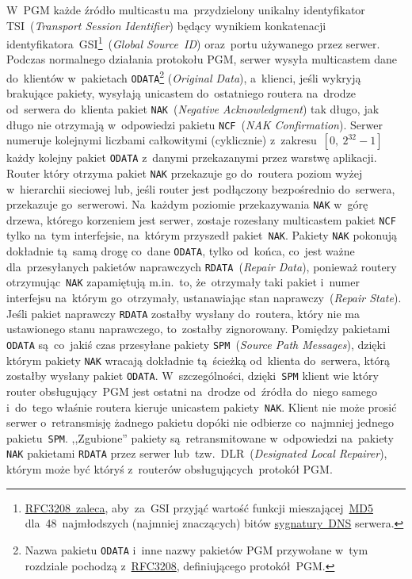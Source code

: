 \documentclass[thesis]{subfiles}
\begin{document}
W~PGM każde źródło multicastu ma~przydzielony unikalny identyfikator TSI~(\emph{Transport Session Identifier}) będący wynikiem konkatenacji identyfikatora~GSI\footnote{\href{https://tools.ietf.org/html/rfc3208\#page-33}{RFC3208~zaleca}, aby~za~GSI przyjąć wartość funkcji mieszającej~\href{https://en.wikipedia.org/wiki/MD5}{MD5} dla~48~najmłodszych (najmniej znaczących) bitów \href{https://tools.ietf.org/html/rfc2535\#section-4}{sygnatury~DNS} serwera.}~(\emph{Global Source~ID}) oraz~portu używanego przez serwer. Podczas normalnego działania protokołu PGM, serwer wysyła multicastem dane do~klientów w~pakietach \texttt{ODATA}\footnote{Nazwa pakietu \texttt{ODATA} i~inne nazwy pakietów PGM przywołane w~tym rozdziale pochodzą z~\href{https://tools.ietf.org/html/rfc3208}{RFC3208}, definiującego protokół~PGM.} (\emph{Original Data}), a~klienci, jeśli wykryją brakujące pakiety, wysyłają unicastem do~ostatniego routera na~drodze od~serwera do~klienta pakiet \texttt{NAK}~(\emph{Negative Acknowledgment}) tak długo, jak długo nie otrzymają w~odpowiedzi pakietu \texttt{NCF}~(\emph{NAK Confirmation}). Serwer numeruje kolejnymi liczbami całkowitymi (cyklicznie) z~zakresu~$[0,~2^{32}-1]$ każdy kolejny pakiet \texttt{ODATA} z~danymi przekazanymi przez warstwę aplikacji. Router który otrzyma pakiet \texttt{NAK} przekazuje go do~routera poziom wyżej w~hierarchii sieciowej lub, jeśli router jest podłączony bezpośrednio do~serwera, przekazuje go~serwerowi. Na~każdym poziomie przekazywania \texttt{NAK} w~górę drzewa, którego korzeniem jest serwer, zostaje rozesłany multicastem pakiet \texttt{NCF} tylko na~tym interfejsie, na~którym przyszedł pakiet~\texttt{NAK}. Pakiety \texttt{NAK} pokonują dokładnie tą~samą drogę co~dane \texttt{ODATA}, tylko od~końca, co~jest ważne dla~przesyłanych pakietów naprawczych \texttt{RDATA}~(\emph{Repair Data}), ponieważ routery otrzymując~\texttt{NAK} zapamiętują m.in.~to, że~otrzymały taki pakiet i~numer interfejsu na~którym go~otrzymały, ustanawiając stan naprawczy~(\emph{Repair State}). Jeśli pakiet naprawczy \texttt{RDATA} zostałby wysłany do~routera, który nie ma ustawionego stanu naprawczego, to~zostałby zignorowany. Pomiędzy pakietami \texttt{ODATA} są~co~jakiś czas przesyłane pakiety \texttt{SPM}~(\emph{Source Path Messages}), dzięki którym pakiety \texttt{NAK} wracają dokładnie tą~ścieżką od~klienta do~serwera, którą zostałby wysłany pakiet \texttt{ODATA}. W~szczególności, dzięki~\texttt{SPM} klient wie który router obsługujący~PGM jest ostatni na~drodze od~źródła do~niego samego i~do~tego właśnie routera kieruje unicastem pakiety~\texttt{NAK}. Klient nie może prosić serwer o~retransmisję żadnego pakietu dopóki nie odbierze co~najmniej jednego pakietu~\texttt{SPM}. ,,Zgubione'' pakiety są~retransmitowane w~odpowiedzi na~pakiety \texttt{NAK} pakietami \texttt{RDATA} przez serwer lub~tzw.~DLR~(\emph{Designated Local Repairer}), którym może być któryś z~routerów obsługujących~protokół PGM.
\end{document}
